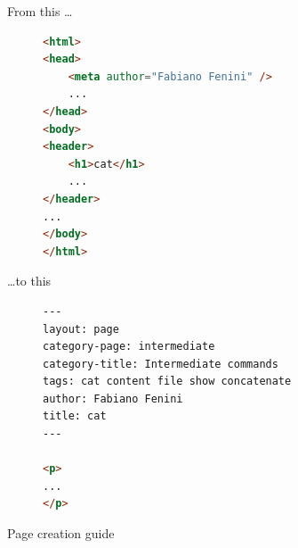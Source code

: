\documentclass[10pt,aspectratio=169]{beamer}
\begin{document}
{
\begin{frame}
\end{frame}}


\begin{frame}[fragile]{From this \ldots}
\begin{figure}[h]
\begin{lstlisting}[language=html]
<html>
<head>
    <meta author="Fabiano Fenini" />
    ...
</head>
<body>
<header>
    <h1>cat</h1>
    ...
</header>
...
</body>
</html>
\end{lstlisting}
\end{figure}
\end{frame}


\begin{frame}[fragile]{\ldots to this}
\begin{figure}[h]
\begin{lstlisting}[language=html]
---
layout: page
category-page: intermediate
category-title: Intermediate commands
tags: cat content file show concatenate
author: Fabiano Fenini
title: cat
---

<p>
...
</p>
\end{lstlisting}
\end{figure}
\end{frame}


\begin{frame}{Page creation guide}
\vfill{}\vfill
\end{frame}
\end{document}
